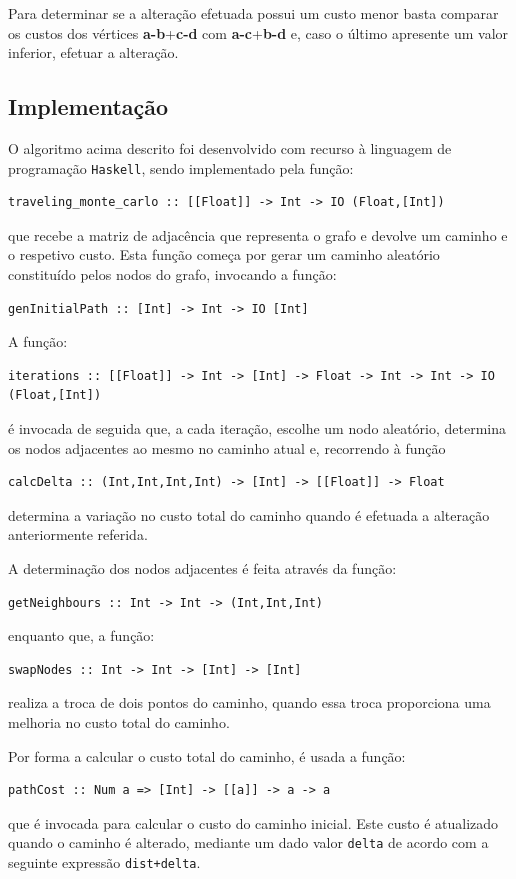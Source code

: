 \documentclass{article}
\begin{document}
Para determinar se a alteração efetuada possui um custo menor basta comparar os custos dos vértices \textbf{a-b}+\textbf{c-d} com \textbf{a-c}+\textbf{b-d} e, caso
o último apresente um valor inferior, efetuar a alteração.

\subsection{Implementação}
O algoritmo acima descrito foi desenvolvido com recurso à linguagem de programação \texttt{Haskell}, sendo implementado pela função:
\begin{verbatim}
traveling_monte_carlo :: [[Float]] -> Int -> IO (Float,[Int])
\end{verbatim}
que recebe a matriz de adjacência que representa o grafo e devolve um caminho e o respetivo custo.
Esta função começa por gerar um caminho aleatório constituído pelos nodos do grafo, invocando a função:
\begin{verbatim}
genInitialPath :: [Int] -> Int -> IO [Int]
\end{verbatim}
A função:
\begin{verbatim}
iterations :: [[Float]] -> Int -> [Int] -> Float -> Int -> Int -> IO (Float,[Int])
\end{verbatim}
é invocada de seguida que, a cada iteração, escolhe um nodo aleatório, determina os nodos adjacentes ao mesmo no caminho atual e, recorrendo à função
\begin{verbatim}
calcDelta :: (Int,Int,Int,Int) -> [Int] -> [[Float]] -> Float
\end{verbatim}
determina a variação no custo total do caminho quando é efetuada a alteração anteriormente referida.

A determinação dos nodos adjacentes é feita através da função:
\begin{verbatim}
getNeighbours :: Int -> Int -> (Int,Int,Int)
\end{verbatim}
enquanto que, a função:
\begin{verbatim}
swapNodes :: Int -> Int -> [Int] -> [Int]
\end{verbatim}
realiza a troca de dois pontos do caminho, quando essa troca proporciona uma melhoria no custo total do caminho.

Por forma a calcular o custo total do caminho, é usada a função:
\begin{verbatim}
pathCost :: Num a => [Int] -> [[a]] -> a -> a
\end{verbatim}
que é invocada para calcular o custo do caminho inicial. Este custo é atualizado quando o caminho é alterado, mediante um dado valor \texttt{delta} 
de acordo com a seguinte expressão \texttt{dist+delta}. 
\end{document}
